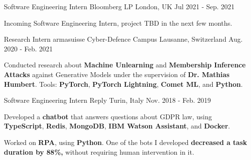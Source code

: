 

\begin{cventries}

  \cventry
  {Software Engineering Intern} %
  {Bloomberg LP} %
  {London, UK} %
  {Jul 2021 - Sep. 2021} %
  {
    \begin{cvitems} %
      \item Incoming Software Engineering Intern, project TBD in the next few months.
    \end{cvitems}
  }

  \cventry
  {Research Intern} %
  {armasuisse Cyber-Defence Campus} %
  {Lausanne, Switzerland} %
  {Aug. 2020 - Feb. 2021} %
  {
    \begin{cvitems} %
      \item Conducted research about \textbf{Machine Unlearning} and \textbf{Membership Inference Attacks} against Generative Models under the supervision of \textbf{Dr. Mathias Humbert}. Tools: \textbf{PyTorch}, \textbf{PyTorch Lightning}, \textbf{Comet ML}, and \textbf{Python}.
    \end{cvitems}
  }

  \cventry
  {Software Engineering Intern} %
  {Reply} %
  {Turin, Italy} %
  {Nov. 2018 - Feb. 2019} %
  {
    \begin{cvitems} %
      \item Developed a \textbf{chatbot} that answers questions about GDPR law, using \textbf{TypeScript}, \textbf{Redis}, \textbf{MongoDB}, \textbf{IBM Watson Assistant}, and \textbf{Docker}.
      \item Worked on \textbf{RPA}, using \textbf{Python}. One of the bots I developed \textbf{decreased a task duration by 88\%,} without requiring human intervention in it.
    \end{cvitems}
  }

\end{cventries}
